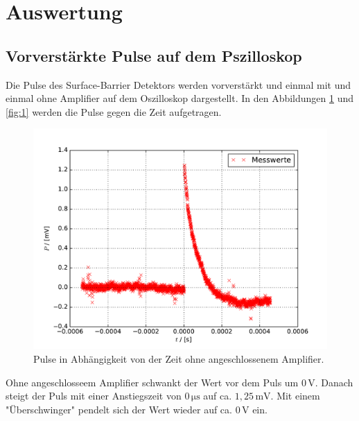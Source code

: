 \section{Auswertung}
\subsection{Vorverstärkte Pulse auf dem Pszilloskop}
Die Pulse des Surface-Barrier Detektors werden vorverstärkt und einmal mit und einmal ohne Amplifier auf dem Oszilloskop dargestellt.
In den Abbildungen \ref{fig:2} und \ref{fig:1} werden die Pulse gegen die Zeit aufgetragen.

\begin{figure}[H]
  \centering
  \includegraphics[width=\textwidth]{osz2.pdf}
  \caption{Pulse in Abhängigkeit von der Zeit ohne angeschlossenem Amplifier.}
  \label{fig:2}
\end{figure}

Ohne angeschlosseem Amplifier schwankt der Wert vor dem Puls um $0\,\text{V}$.
Danach steigt der Puls mit einer Anstiegszeit von $0\,\si{\micro\second}$ auf ca. $1,25\,\text{mV}$.
Mit einem "Überschwinger" pendelt sich der Wert wieder auf ca. $0\,\text{V}$ ein.

